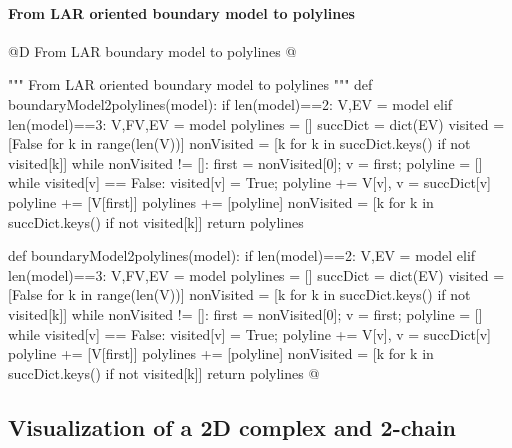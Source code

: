 \documentclass[11pt,oneside]{article}	%
\begin{document}
\paragraph{From LAR oriented boundary model to polylines}
@D From LAR boundary model to polylines
@{""" From LAR oriented boundary model to polylines """
def boundaryModel2polylines(model):
    if len(model)==2: V,EV = model
    elif len(model)==3: V,FV,EV = model
    polylines = []
    succDict = dict(EV)
    visited = [False for k in range(len(V))]
    nonVisited = [k for k in succDict.keys() if not visited[k]]
    while nonVisited != []:
        first = nonVisited[0]; v = first; polyline = []
        while visited[v] == False:
            visited[v] = True; 
            polyline += V[v], 
            v = succDict[v]
        polyline += [V[first]]
        polylines += [polyline]
        nonVisited = [k for k in succDict.keys() if not visited[k]]
    return polylines

def boundaryModel2polylines(model):
    if len(model)==2: V,EV = model
    elif len(model)==3: V,FV,EV = model
    polylines = []
    succDict = dict(EV)
    visited = [False for k in range(len(V))]
    nonVisited = [k for k in succDict.keys() if not visited[k]]
    while nonVisited != []:
        first = nonVisited[0]; v = first; polyline = []
        while visited[v] == False:
            visited[v] = True; 
            polyline += V[v], 
            v = succDict[v]
        polyline += [V[first]]
        polylines += [polyline]
        nonVisited = [k for k in succDict.keys() if not visited[k]]
    return polylines
@}





\subsection{Visualization of a 2D complex and 2-chain}
\end{document}
